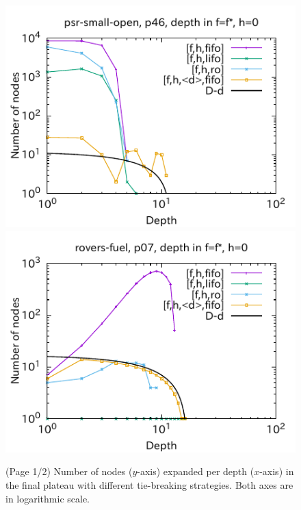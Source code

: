 \begin{figure}[htbp]
\includegraphics[width=0.49\linewidth]{img/output-lmcut/psr-small-open/p46-0.pdf}
\includegraphics[width=0.49\linewidth]{img/output-lmcut/rovers-fuel/p07-0.pdf}
 \caption{(Page 1/2) Number of nodes ($y$-axis) expanded per depth ($x$-axis) in
 the final plateau with different tie-breaking strategies. Both axes are in logarithmic scale.
 }
 \label{fig:depth-histogram2}
\end{figure}

